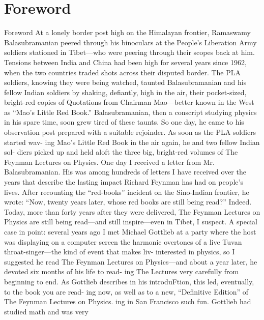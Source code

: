 \documentclass[10pt,oneside]{article}
\begin{document}
\clearpage
{}
\section*{Foreword}
\label{tips-sec-2-foreword}
Foreword At a lonely border post high on the Himalayan frontier, Ramaswamy Balasubramanian peered through his binoculars at the People’s Liberation Army soldiers stationed in Tibet---who were peering through their scopes back at him. Tensions between India and China had been high for several years since 1962, when the two countries traded shots across their disputed border. The PLA soldiers, knowing they were being watched, taunted Balasubramanian and his fellow Indian soldiers by shaking, defiantly, high in the air, their pocket-sized, bright-red copies of Quotations from Chairman Mao---better known in the West as “Mao’s Little Red Book.” Balasubramanian, then a conscript studying physics in his spare time, soon grew tired of these taunts. So one day, he came to his observation post prepared with a suitable rejoinder. As soon as the PLA soldiers started wav- ing Mao’s Little Red Book in the air again, he and two fellow Indian sol- diers picked up and held aloft the three big, bright-red volumes of The Feynman Lectures on Physics. One day I received a letter from Mr. Balasubramanian. His was among hundreds of letters I have received over the years that describe the lasting impact Richard Feynman has had on people’s lives. After recounting the “red-books” incident on the Sino-Indian frontier, he wrote: “Now, twenty years later, whose red books are still being read?” Indeed. Today, more than forty years after they were delivered, The Feynman Lectures on Physics are still being read---and still inspire---even in Tibet, I suspect. A special case in point: several years ago I met Michael Gottlieb at a party where the host was displaying on a computer screen the harmonic overtones of a live Tuvan throat-singer---the kind of event that makes liv- interested in physics, so I suggested he read The Feynman Lectures on Physics---and about a year later, he devoted six months of his life to read- ing The Lectures very carefully from beginning to end. As Gottlieb describes in his introduFtion, this led, eventually, to the book you are read- ing now, as well as to a new, “Definitive Edition” of The Feynman Lectures on Physics. ing in San Francisco such fun. Gottlieb had studied math and was very\par
\end{document}
